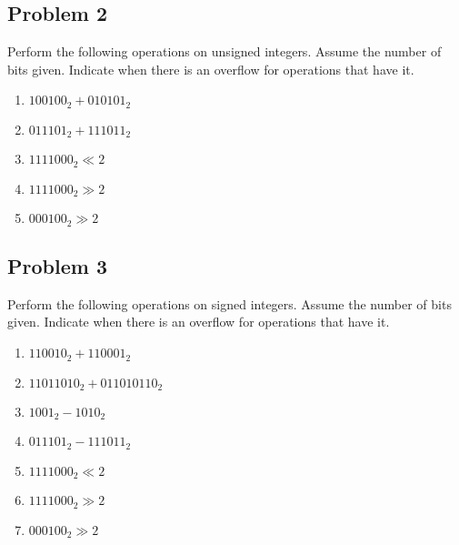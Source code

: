 \documentclass{article}
\begin{document}
\subsection*{Problem 2}
Perform the following operations on unsigned integers. Assume the number of bits given. Indicate when there is an overflow for operations that have it.
\begin{enumerate}[label=\alph*.]
    \item $100100_2 + 010101_2$
    \item $011101_2 + 111011_2$
    \item $1111000_2 \ll 2$ 
    \item $1111000_2 \gg 2$
    \item $000100_2 \gg 2$
\end{enumerate}

\subsection*{Problem 3}
Perform the following operations on signed integers. Assume the number of bits given. Indicate when there is an overflow for operations that have it.
\begin{enumerate}[label=\alph*.]
    \item $110010_2 + 110001_2$
    \item $11011010_2 + 011010110_2$
    \item $1001_2 - 1010_2$
    \item $011101_2 - 111011_2$
    \item $1111000_2 \ll 2$ 
    \item $1111000_2 \gg 2$
    \item $000100_2 \gg 2$
\end{enumerate}
\end{document}
